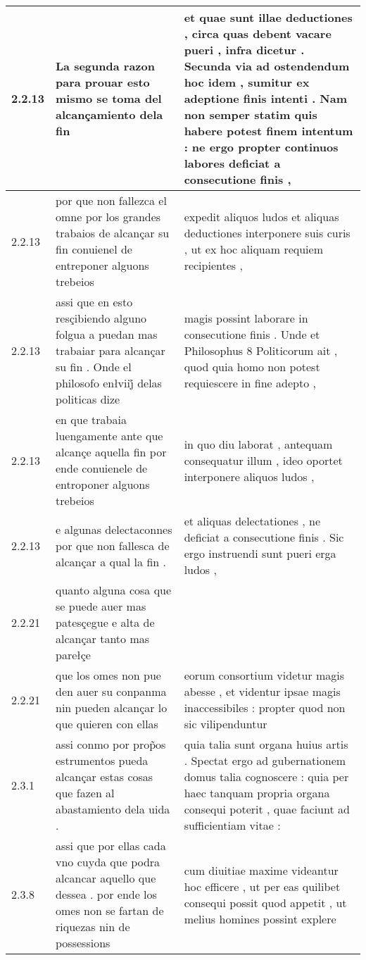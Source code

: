 \begin{tabular}{|p{1cm}|p{6.5cm}|p{6.5cm}|}
2.2.13 & La segunda razon para prouar esto mismo se toma del alcançamiento dela fin & et quae sunt illae deductiones , circa quas debent vacare pueri , infra dicetur . Secunda via ad ostendendum hoc idem , sumitur ex adeptione finis intenti . Nam non semper statim quis habere potest finem intentum : ne ergo propter continuos labores deficiat a consecutione finis , \\\hline
2.2.13 & por que non fallezca el omne por los grandes trabaios de alcançar su fin conuienel de entreponer alguons trebeios & expedit aliquos ludos et aliquas deductiones interponere suis curis , ut ex hoc aliquam requiem recipientes , \\\hline
2.2.13 & assi que en esto resçibiendo alguno folgua a puedan mas trabaiar para alcançar su fin . Onde el philosofo enłviij̊ delas politicas dize & magis possint laborare in consecutione finis . Unde et Philosophus 8 Politicorum ait , quod quia homo non potest requiescere in fine adepto , \\\hline
2.2.13 & en que trabaia luengamente ante que alcançe aquella fin por ende conuienele de entroponer alguons trebeios & in quo diu laborat , antequam consequatur illum , ideo oportet interponere aliquos ludos , \\\hline
2.2.13 & e algunas delectaconnes por que non fallesca de alcançar a qual la fin . & et aliquas delectationes , ne deficiat a consecutione finis . Sic ergo instruendi sunt pueri erga ludos , \\\hline
2.2.21 & quanto alguna cosa que se puede auer mas patesçegue e alta de alcançar tanto mas parełçe &  \\\hline
2.2.21 & que los omes non pue den auer su conpanma nin pueden alcançar lo que quieren con ellas & eorum consortium videtur magis abesse , et videntur ipsae magis inaccessibiles : propter quod non sic vilipenduntur \\\hline
2.3.1 & assi conmo por prop̃os estrumentos pueda alcançar estas cosas que fazen al abastamiento dela uida . & quia talia sunt organa huius artis . Spectat ergo ad gubernationem domus talia cognoscere : quia per haec tanquam propria organa consequi poterit , quae faciunt ad sufficientiam vitae : \\\hline
2.3.8 & assi que por ellas cada vno cuyda que podra alcancar aquello que dessea . por ende los omes non se fartan de riquezas nin de possessions & cum diuitiae maxime videantur hoc efficere , ut per eas quilibet consequi possit quod appetit , ut melius homines possint explere \\\hline

\end{tabular}
